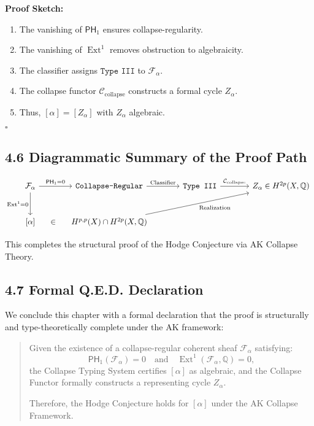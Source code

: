 \documentclass[11pt]{article}
\DeclareMathOperator{\Ext}{Ext}
\begin{document}
\textbf{Proof Sketch:}
\begin{enumerate}
  \item The vanishing of $\mathsf{PH}_1$ ensures collapse-regularity.
  \item The vanishing of $\Ext^1$ removes obstruction to algebraicity.
  \item The classifier assigns $\texttt{Type III}$ to $\mathcal{F}_\alpha$.
  \item The collapse functor $\mathcal{C}_{\text{collapse}}$ constructs a formal cycle $Z_\alpha$.
  \item Thus, $[\alpha] = [Z_\alpha]$ with $Z_\alpha$ algebraic.
\end{enumerate}

$\square$

\subsection{4.6 Diagrammatic Summary of the Proof Path}

\[
\begin{tikzcd}[row sep=large, column sep=large]
\mathcal{F}_\alpha 
  \arrow[r, "\mathsf{PH}_1 = 0"] 
  \arrow[d, swap, "\Ext^1 = 0"]
& \texttt{Collapse-Regular} 
  \arrow[r, "\text{Classifier}"]
& \texttt{Type III} 
  \arrow[r, "\mathcal{C}_{\text{collapse}}"]
& |[alias=Z]| {Z_\alpha \in H^{2p}(X, \mathbb{Q})} \\
%
{[\alpha]} 
  \arrow[r, phantom, "\in"]
& H^{p,p}(X) \cap H^{2p}(X, \mathbb{Q}) 
  \arrow[to=Z, "\text{Realization}"']
\end{tikzcd}
\]

This completes the structural proof of the Hodge Conjecture via AK Collapse Theory.

\subsection{4.7 Formal Q.E.D. Declaration}

We conclude this chapter with a formal declaration that the proof is structurally and type-theoretically complete under the AK framework:

\begin{quote}
Given the existence of a collapse-regular coherent sheaf $\mathcal{F}_\alpha$ satisfying:
\[
\mathsf{PH}_1(\mathcal{F}_\alpha) = 0 \quad \text{and} \quad \Ext^1(\mathcal{F}_\alpha, \mathbb{Q}) = 0,
\]
the Collapse Typing System certifies $[\alpha]$ as algebraic, and the Collapse Functor formally constructs a representing cycle $Z_\alpha$.

Therefore, the Hodge Conjecture holds for $[\alpha]$ under the AK Collapse Framework.
\end{quote}
\end{document}
